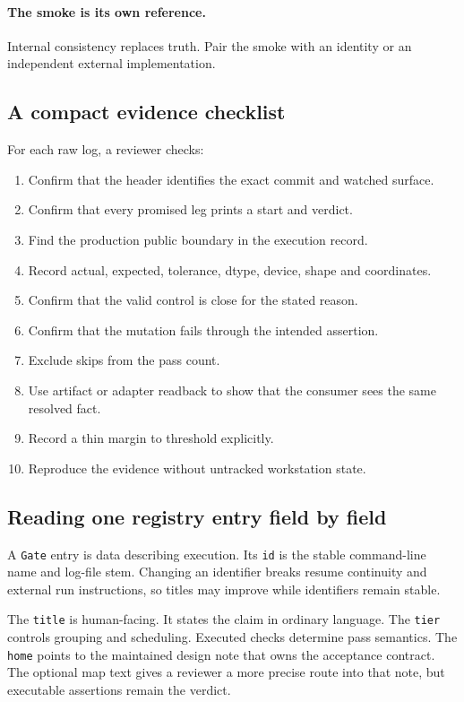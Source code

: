 \documentclass[10pt,aps,prd,twocolumn,nofootinbib]{revtex4-2}
\newcommand{\code}[1]{\texttt{#1}}
\begin{document}
\paragraph{The smoke is its own reference.}
Internal consistency replaces truth.  Pair the smoke with an identity or an
independent external implementation.

\subsection{A compact evidence checklist}

For each raw log, a reviewer checks:
\begin{enumerate}
  \item Confirm that the header identifies the exact commit and watched surface.
  \item Confirm that every promised leg prints a start and verdict.
  \item Find the production public boundary in the execution record.
  \item Record actual, expected, tolerance, dtype, device, shape and coordinates.
  \item Confirm that the valid control is close for the stated reason.
  \item Confirm that the mutation fails through the intended assertion.
  \item Exclude skips from the pass count.
  \item Use artifact or adapter readback to show that the consumer sees the
        same resolved fact.
  \item Record a thin margin to threshold explicitly.
  \item Reproduce the evidence without untracked workstation state.
\end{enumerate}

\subsection{Reading one registry entry field by field}

A \code{Gate} entry is data describing execution.  Its \code{id} is the stable
command-line name and log-file stem.  Changing an identifier breaks resume
continuity and external run instructions, so titles may improve while
identifiers remain stable.

The \code{title} is human-facing.  It states the claim in ordinary language.
The \code{tier} controls grouping and scheduling.  Executed checks determine
pass semantics.  The
\code{home} points to the maintained design note that owns the acceptance
contract.  The optional map text gives a reviewer a more precise route into
that note, but executable assertions remain the verdict.
\end{document}
